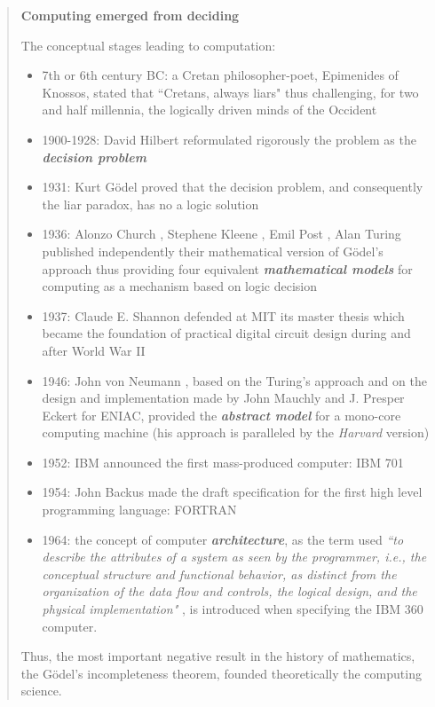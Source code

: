 {\small
\begin{shaded*}
\begin{quote}
{\bf Computing emerged from deciding}

\smallskip

The conceptual stages leading to computation:
\begin{itemize}
  \item 7th or 6th century BC: a Cretan philosopher-poet, Epimenides of Knossos, stated that ``Cretans, always liars" thus challenging, for two and half millennia, the logically driven minds of the Occident
  \item 1900-1928: David Hilbert \citep{Hilbert1900, HilbertAckermann28} reformulated rigorously the problem as the {\bf {\em decision problem}}
  \item 1931: Kurt G\" odel \citep{Godel31} proved that the decision problem, and consequently the liar paradox, has no a logic solution
  \item 1936: Alonzo Church \citep{Church36}, Stephene Kleene \citep{Kleene36}, Emil Post \citep{Post36}, Alan Turing \citep{Turing36} published independently their mathematical version of G\" odel's approach thus providing four equivalent {\bf {\em mathematical models}} for computing as a mechanism based on logic decision
  \item 1937: Claude E. Shannon \citep{Shannon48} defended at MIT its master thesis which became the foundation of practical digital circuit design during and after World War II
  \item 1946: John von Neumann \citep{vonNeumann45}, based on the Turing's approach and on the design and implementation made by John Mauchly and J. Presper Eckert for ENIAC, provided the {\bf {\em abstract model}} for a mono-core computing machine (his approach  is paralleled  by the {\em Harvard} version)
  \item 1952: IBM announced the first mass-produced computer: IBM 701
  \item 1954: John Backus made the draft specification for the first high level programming language: FORTRAN
  \item 1964: the concept of computer {\bf {\em architecture}}, as the term used {\em ``to describe the attributes of a system as seen by the programmer, i.e., the conceptual structure and functional behavior, as distinct from the organization of the data flow
and controls, the logical design, and the physical implementation"} \citep{Amdahl64}, is introduced when specifying the IBM 360 computer.
\end{itemize}
Thus, the most important negative result in the history of mathematics, the G\" odel's incompleteness theorem, founded theoretically the computing science.
\end{quote}
\end{shaded*}
}

